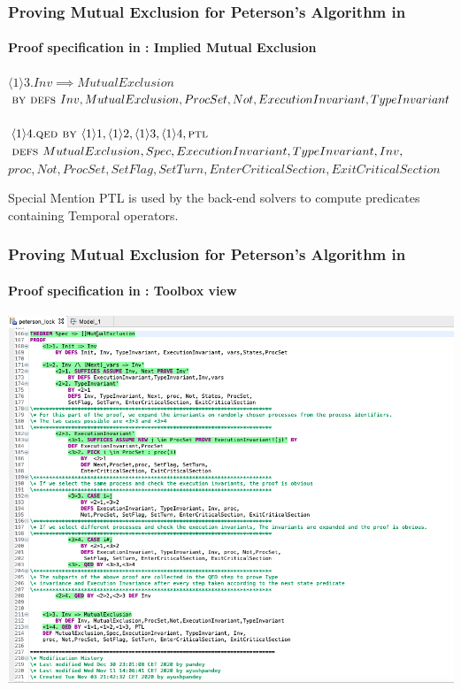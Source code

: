 \documentclass[xcolor=dvipsnames]{beamer}
\begin{document}
\begin{frame}
	\frametitle{Proving Mutual Exclusion for Peterson's Algorithm in \tla}
	\framesubtitle{Proof specification in \tla : Implied Mutual Exclusion}
	\fontsize{8}{10}\selectfont

	\hspace*{0cm}$\langle1\rangle3. Inv \implies MutualExclusion$\\
	\hspace*{0.4cm}$ \textsc{by }\textsc{defs } Inv, MutualExclusion,ProcSet,Not,ExecutionInvariant,TypeInvariant$\\~\\
	\hspace*{0cm}$\langle1\rangle4. \textsc{qed } \textsc{by } \langle1\rangle1,\langle1\rangle2,\langle1\rangle3,\langle1\rangle4, \textsc{ptl }$\\
	\hspace*{0.4cm}$\textsc{defs } MutualExclusion,Spec,ExecutionInvariant, TypeInvariant, Inv, $\\
	\hspace*{0.4cm} $proc, Not,ProcSet, SetFlag, SetTurn, EnterCriticalSection, ExitCriticalSection$\\
	
	\begin{block}{Special Mention}
		PTL is used by the back-end solvers to compute predicates containing Temporal operators. 
	\end{block}
\end{frame}

\begin{frame}
	\frametitle{Proving Mutual Exclusion for Peterson's Algorithm in \tla}
	\framesubtitle{Proof specification in \tla : Toolbox view}
	\includegraphics[width=\linewidth,height=\textheight,keepaspectratio]{toolboxproof}
	
\end{frame}
\end{document}
